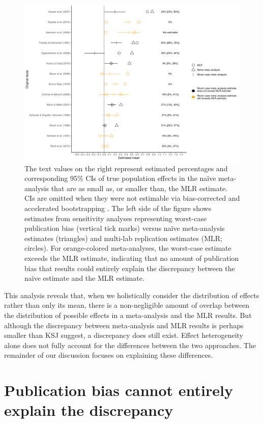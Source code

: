 \documentclass[man,floatsintext]{apa7}
\begin{document}
\begin{figure}[ht]
\centering
     \includegraphics[width=6.5in]{fig2.pdf}
      \caption{The text values on the right represent estimated percentages and corresponding 95\% CIs of true population effects in the naïve meta-analysis that are as small as, or smaller than, the MLR estimate. CIs are omitted when they were not estimable via bias-corrected and accelerated bootstrapping \parencite{mathur2020robust}. The left side of the figure shows estimates from sensitivity analyses representing worst-case publication bias (vertical tick marks) versus na\"ive meta-analysis estimates (triangles) and multi-lab replication estimates (MLR; circles). For orange-colored meta-analyses, the worst-case estimate exceeds the MLR estimate, indicating that no amount of publication bias that results could entirely explain the discrepancy between the naïve estimate and the MLR estimate. }
\end{figure}

This analysis reveals that, when we holistically consider the distribution of effects rather than only its mean, there is a non-negligible amount of overlap between the distribution of possible effects in a meta-analysis and the MLR results. But although the discrepancy between meta-analysis and MLR results is perhaps smaller than KSJ suggest, a discrepancy does still exist. Effect heterogeneity alone does not fully account for the differences between the two approaches. The remainder of our discussion focuses on explaining these differences.

\section{Publication bias cannot entirely explain the discrepancy}
\end{document}
